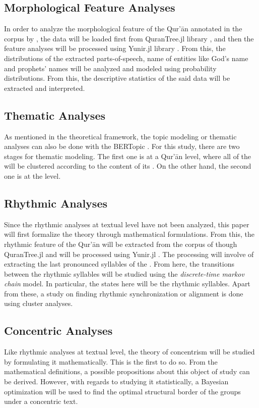 \subsection{Morphological Feature Analyses}
In order to analyze the morphological feature of the Qur'\=an annotated in the corpus by , the data will be loaded first from QuranTree.jl library , and then the feature analyses will be processed using Yunir.jl library . From this, the distributions of the extracted parts-of-speech, name of entities like God's name and prophets' names will be analyzed and modeled using probability distributions. From this, the descriptive statistics of the said data will be extracted and interpreted.
\subsection{Thematic Analyses}
As mentioned in the theoretical framework, the topic modeling or thematic analyses can also be done with the BERTopic . For this study, there are two stages for thematic modeling. The first one is at a Qur'\=an level, where all of the   will be clustered according to the content of its  . On the other hand, the second one is at the   level.
\subsection{Rhythmic Analyses}
Since the rhythmic analyses at textual level have not been analyzed, this paper will first formalize the theory through mathematical formulations. From this, the rhythmic feature of the Qur'\=an will be extracted from the corpus of  though \mbox{QuranTree.jl}  and will be processed using \mbox{Yunir.jl} . The processing will involve of extracting the last pronounced syllables of the  . From here, the transitions between the rhythmic syllables will be studied using the \textit{discrete-time markov chain} model. In particular, the states here will be the rhythmic syllables. Apart from these, a study on finding rhythmic synchronization or alignment is done using cluster analyses.
\subsection{Concentric Analyses}
Like rhythmic analyses at textual level, the theory of concentrism will be studied by formulating it mathematically. This is the first to do so. From the mathematical definitions, a possible propositions about this object of study can be derived. However, with regards to studying it statistically, a Bayesian optimization will be used to find the optimal structural border of the groups under a concentric text.
